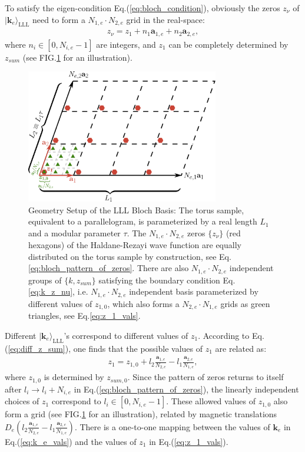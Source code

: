 To satisfy the eigen-condition Eq.(\ref{eq:bloch_condition}), obviously the zeros $z_\nu$ of $|\mathbf k_e\rangle_{\text{LLL}}$ need to form a $N_{1,e}\cdot N_{2,e}$ grid in the real-space:
\begin{align}
    z_\nu=z_1+n_1 \mathbf a_{1,e}+ n_2 \mathbf a_{2,e},\label{eq:bloch_pattern_of_zeros}
\end{align}
where $n_i \in [0,N_{i,e}-1]$ are integers, and $z_1$ can be completely determined by $z_{sum}$ (see FIG.\ref{fig:LLL_bloch_basis} for an illustration).
\begin{figure}
    \centering
    \includegraphics[width=0.75\textwidth]{figures/FCI/Haldane_Rezayi.pdf}
    \caption{Geometry Setup of the LLL Bloch Basis: The torus sample, equivalent to a parallelogram, is parameterized by a real length $L_1$ and a modular parameter $\tau$. The $N_{1,e}\cdot N_{2,e}$ zeros $\{z_\nu\}$ (red hexagons) of the Haldane-Rezayi wave function are equally distributed on the torus sample by construction, see Eq.\eqref{eq:bloch_pattern_of_zeros}. There are also $N_{1,e}\cdot N_{2,e}$ independent groups of $\{k, z_{sum}\}$ satisfying the boundary condition Eq.\eqref{eq:k_z_nu}, i.e. $N_{1,e}\cdot N_{2,e}$ independent basis parameterized by different values of $z_{1,0}$, which also forms a $N_{2,e}\cdot N_{1,e}$ grids as green triangles, see Eq.\eqref{eq:z_1_vals}.}
    \label{fig:LLL_bloch_basis}
\end{figure}
Different $|\mathbf k_e\rangle_{\text{LLL}}$'s correspond to different values of $z_1$. According to Eq.(\ref{eq:diff_z_sum}), one finds that the possible values of $z_1$ are related as:
\begin{align}
    z_1=z_{1,0}+l_2\frac{\mathbf a_{1,e}}{N_{2,e}}-l_1\frac{\mathbf a_{2,e}}{N_{1,e}}, \label{eq:z_1_vals}
\end{align}
where $z_{1,0}$ is determined by $z_{sum,0}$. Since the pattern of zeros returns to itself after $l_i\rightarrow l_i+N_{i,e}$ in Eq.(\ref{eq:bloch_pattern_of_zeros}), the linearly independent choices of $z_1$ correspond to $l_i\in [0,N_{i,e}-1]$. These allowed values of $z_{1,0}$ also form a grid (see FIG.\ref{fig:LLL_bloch_basis} for an illustration), related by magnetic translations $D_e(l_2\frac{\mathbf a_{1,e}}{N_{2,e}}-l_1\frac{\mathbf a_{2,e}}{N_{1,e}})$. There is a one-to-one mapping between the values of $\mathbf k_e$ in Eq.(\ref{eq:k_e_vals}) and the values of $z_1$ in Eq.(\ref{eq:z_1_vals}).

